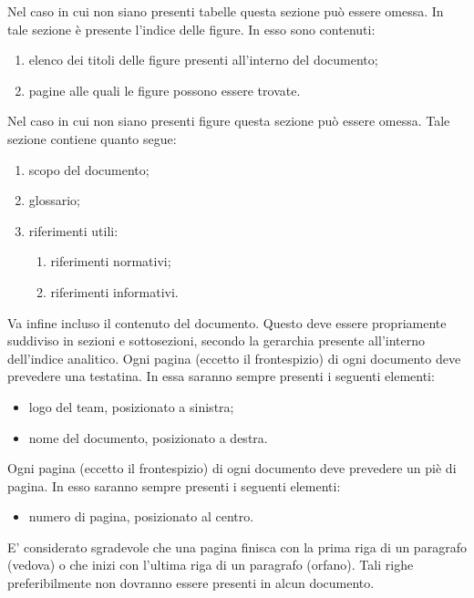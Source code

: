 				Nel caso in cui non siano presenti tabelle questa sezione può essere omessa.
				In tale sezione è presente l’indice delle figure. In esso sono contenuti:
				\begin{enumerate}
					\item elenco dei titoli delle figure presenti all’interno del documento;
					\item pagine alle quali le figure possono essere trovate.
				\end{enumerate}
				Nel caso in cui non siano presenti figure questa sezione può essere omessa.
				Tale sezione contiene quanto segue:
				\begin{enumerate}
					\item scopo del documento;
					\item glossario;
					\item riferimenti utili:
					\begin{enumerate}
						\item riferimenti normativi;
						\item riferimenti informativi.
					\end{enumerate}
				\end{enumerate}
				Va infine incluso il contenuto del documento. Questo deve essere propriamente suddiviso in sezioni e sottosezioni, secondo la gerarchia presente all’interno dell’indice analitico.
					Ogni pagina (eccetto il frontespizio) di ogni documento deve prevedere una testatina. In essa saranno sempre presenti i seguenti elementi:
					\begin{itemize}
						\item logo del team, posizionato a sinistra;
						\item nome del documento, posizionato a destra.
					\end{itemize}
					Ogni pagina (eccetto il frontespizio) di ogni documento deve prevedere un piè di pagina. In esso saranno sempre presenti i seguenti elementi:
					\begin{itemize}
						\item numero di pagina, posizionato al centro.
					\end{itemize}
					E’ considerato sgradevole che una pagina finisca con la prima riga di un paragrafo (vedova) o che inizi con l’ultima riga di un paragrafo (orfano). Tali righe preferibilmente non dovranno essere presenti in alcun documento.
